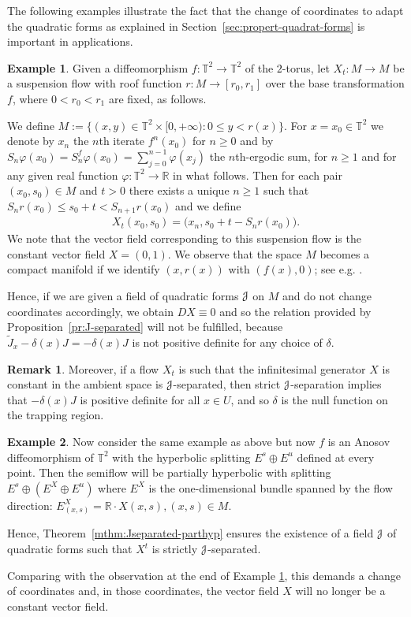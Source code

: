 \documentclass[12pt,reqno]{amsart}
\numberwithin{equation}{section}
\theoremstyle{plain}
\theoremstyle{definition}
\newtheorem{remark}[theorem]{Remark}
\newtheorem{example}{Example}
\newcommand{\RR}{{\mathbb R}}
\newcommand{\TT}{{\mathbb T}}
\newcommand{\vfi}{\varphi}
\newcommand{\J}{\EuScript{J}}
\begin{document}
The following examples illustrate the fact that the change
of coordinates to adapt the quadratic forms as explained in
Section~\ref{sec:propert-quadrat-forms} is important in
applications.

\begin{example}
  \label{ex:suspension}
  Given a diffeomorphism $f:\TT^2\to \TT^2$ of the
  $2$-torus, let $X_t:M\to M$ be a suspension flow with roof
  function $r:M\to[r_0,r_1]$ over the base transformation
  $f$, where $0<r_0<r_1$ are fixed, as follows.

  We define $M:=\{ (x,y)\in \TT^2\times[0,+\infty): 0\le y <
  r(x) \}$.  For $x=x_0\in \TT^2$ we denote by $x_n$ the
  $n$th iterate $f^n(x_0)$ for $n\ge0$ and by $S_n \vfi(x_0)
  = S_n^f \vfi(x_0) = \sum_{j=0}^{n-1} \vfi( x_j )$ the
  $n$th-ergodic sum, for $n\ge1$ and for any given real
  function $\vfi:\TT^2\to\RR$ in what follows. Then for each
  pair $(x_0,s_0)\in M$ and $t>0$ there exists a unique
  $n\ge1$ such that $S_n r(x_0) \le s_0+ t < S_{n+1} r(x_0)$
  and we define
\begin{align*}
   X_t(x_0,s_0) = \big(x_n,s_0+t-S_n r(x_0)\big).
\end{align*}
We note that the vector field corresponding to this
suspension flow is the constant vector field $X=(0,1)$. We
observe that the space $M$ becomes a compact manifold if we
identify $(x,r(x))$ with $(f(x),0)$; see e.g.  \cite{PM82}.

Hence, if we are given a field of quadratic forms $\J$ on
$M$ and do not change coordinates accordingly, we obtain
$DX\equiv0$ and so the relation provided by
Proposition~\ref{pr:J-separated} will not be fulfilled,
because $\tilde J_x -\delta(x) J = -\delta(x) J$ is not
positive definite for any choice of $\delta$.
\end{example}

\begin{remark}\label{rmk:delta-null}
  Moreover, if a flow $X_t$ is such that the infinitesimal
  generator $X$ is constant in the ambient space is
  $\J$-separated, then strict $\J$-separation implies that
  $-\delta(x) J$ is positive definite for all $x\in U$, and
  so $\delta$ is the null function on the trapping region.
\end{remark}

\begin{example}
  \label{ex:J-separated}
  Now consider the same example as above but now $f$ is an
  Anosov diffeomorphism of $\TT^2$ with the hyperbolic
  splitting $E^s\oplus E^u$ defined at every point. Then the
  semiflow will be partially hyperbolic with splitting
  $E^s\oplus (E^X\oplus E^u)$ where $E^X$ is the
  one-dimensional bundle spanned by the flow direction:
  $E^X_{(x,s)}=\RR\cdot X(x,s), (x,s)\in M$.

  Hence, Theorem~\ref{mthm:Jseparated-parthyp} ensures the
  existence of a field $\J$ of quadratic forms such that
  $X^t$ is strictly $\J$-separated.

  Comparing with the observation at the end of Example
  \ref{ex:suspension}, this demands a change of
  coordinates and, in those coordinates, the vector field
  $X$ will no longer be a constant vector field.
\end{example}
\end{document}
